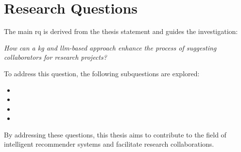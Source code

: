 \section{Research Questions}\label{sec:research-questions}
The main \gls{rq} is derived from the thesis statement and guides the investigation:
\begin{center}
	\textit{How can a \gls{kg} and \gls{llm}-based approach enhance the process of suggesting collaborators for research projects?}
\end{center}

To address this question, the following subquestions are explored:
\begin{itemize}
	\item \rqOne
	\item \rqTwo
	\item \rqThree
	\item \rqFour
\end{itemize}


By addressing these questions, this thesis aims to contribute to the field of intelligent recommender systems and facilitate research collaborations.

